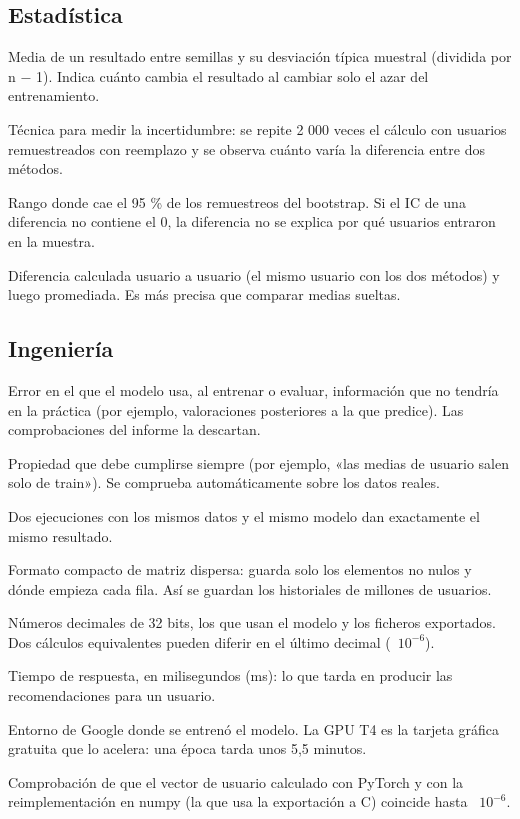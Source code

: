 \subsection*{Estadística}
\begin{description}\setlength{\itemsep}{2pt}
\item[Media $\pm$ desviación típica] Media de un resultado entre semillas y su desviación típica muestral (dividida por n $-$ 1). Indica cuánto cambia el resultado al cambiar solo el azar del entrenamiento.
\item[Bootstrap de usuarios] Técnica para medir la incertidumbre: se repite 2 000 veces el cálculo con usuarios remuestreados con reemplazo y se observa cuánto varía la diferencia entre dos métodos.
\item[Intervalo de confianza (IC) del 95 \%] Rango donde cae el 95 \% de los remuestreos del bootstrap. Si el IC de una diferencia no contiene el 0, la diferencia no se explica por qué usuarios entraron en la muestra.
\item[Diferencia pareada] Diferencia calculada usuario a usuario (el mismo usuario con los dos métodos) y luego promediada. Es más precisa que comparar medias sueltas.
\end{description}

\subsection*{Ingeniería}
\begin{description}\setlength{\itemsep}{2pt}
\item[Fuga de datos (leakage)] Error en el que el modelo usa, al entrenar o evaluar, información que no tendría en la práctica (por ejemplo, valoraciones posteriores a la que predice). Las comprobaciones del informe la descartan.
\item[Invariante] Propiedad que debe cumplirse siempre (por ejemplo, «las medias de usuario salen solo de train»). Se comprueba automáticamente sobre los datos reales.
\item[Determinismo] Dos ejecuciones con los mismos datos y el mismo modelo dan exactamente el mismo resultado.
\item[CSR] Formato compacto de matriz dispersa: guarda solo los elementos no nulos y dónde empieza cada fila. Así se guardan los historiales de millones de usuarios.
\item[float32 /\allowbreak{} norma numérica] Números decimales de 32 bits, los que usan el modelo y los ficheros exportados. Dos cálculos equivalentes pueden diferir en el último decimal (~$10^{-6}$).
\item[Latencia] Tiempo de respuesta, en milisegundos (ms): lo que tarda en producir las recomendaciones para un usuario.
\item[Colab /\allowbreak{} GPU T4] Entorno de Google donde se entrenó el modelo. La GPU T4 es la tarjeta gráfica gratuita que lo acelera: una época tarda unos 5,5 minutos.
\item[Coherencia numpy /\allowbreak{} PyTorch] Comprobación de que el vector de usuario calculado con PyTorch y con la reimplementación en numpy (la que usa la exportación a C) coincide hasta ~$10^{-6}$.
\end{description}
